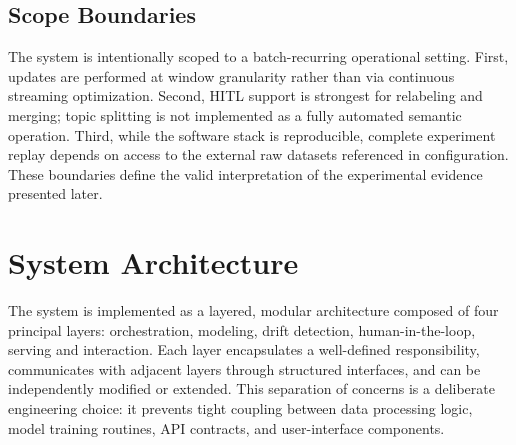 \documentclass[conference]{IEEEtran}
\newcommand{\hitl}{HITL\xspace}
\begin{document}


\subsection{Scope Boundaries}
The system is intentionally scoped to a batch-recurring operational setting. First, updates are performed at window granularity rather than via continuous streaming optimization. Second, \hitl support is strongest for relabeling and merging; topic splitting is not implemented as a fully automated semantic operation. Third, while the software stack is reproducible, complete experiment replay depends on access to the external raw datasets referenced in configuration. These boundaries define the valid interpretation of the experimental evidence presented later.

\section{System Architecture}
The system is implemented as a layered, modular architecture composed of four principal layers: orchestration, modeling, drift detection, human-in-the-loop, serving and interaction. Each layer encapsulates a well-defined responsibility, communicates with adjacent layers through structured interfaces, and can be independently modified or extended. This separation of concerns is a deliberate engineering choice: it prevents tight coupling between data processing logic, model training routines, API contracts, and user-interface components.
\end{document}
